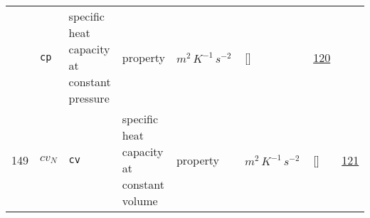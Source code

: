 \begin{longtable}{|p{1cm}|p{3cm}|p{3cm}|p{7cm}|p{3.0cm}|p{3cm}|p{2cm}|p{1cm}|}
             & \verb|cp|
             & specific heat capacity at constant pressure
             & \begin{lay}property \end{lay}
             & $ m^{2} \,K^{-1} \,s^{-2} \, $
             & []
             & \hyperlink{"e:120"}{ 120 }
                 \\
    149
             & \hypertarget{"v:149"}{ $ {cv}{_{N}} $}
             & \verb|cv|
             & specific heat capacity at constant volume
             & \begin{lay}property \end{lay}
             & $ m^{2} \,K^{-1} \,s^{-2} \, $
             & []
             & \hyperlink{"e:121"}{ 121 }
                 \\
    \end{longtable}